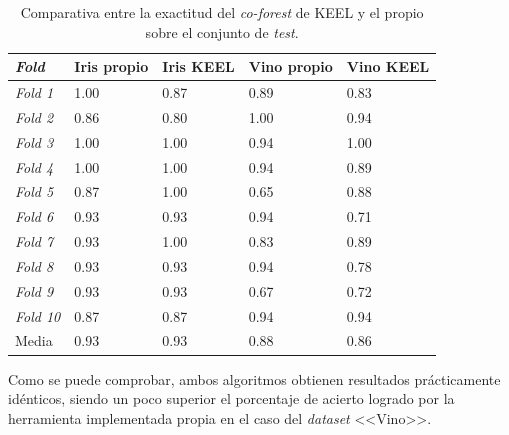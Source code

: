\begin{table}
	\begin{centering}
		
		\begin{tabular}{@{}p{6em} p{6em} p{6em} p{6em} p{6em} @{}}
			
			\toprule
			\textbf{\textit{Fold}} & \textbf{Iris propio} & \textbf{Iris KEEL} & \textbf{Vino propio} & \textbf{Vino KEEL}\\ 
			\midrule
			\textit{Fold 1} &1.00	&0.87	&0.89	&0.83 \\
			\textit{Fold 2} &0.86	&0.80	&1.00	&0.94 \\
			\textit{Fold 3} &1.00	&1.00	&0.94	&1.00 \\
			\textit{Fold 4} &1.00	&1.00	&0.94	&0.89 \\
			\textit{Fold 5} &0.87	&1.00	&0.65	&0.88 \\
			\textit{Fold 6} &0.93	&0.93	&0.94	&0.71 \\
			\textit{Fold 7} &0.93	&1.00	&0.83	&0.89 \\
			\textit{Fold 8} &0.93	&0.93	&0.94	&0.78 \\
			\textit{Fold 9} &0.93	&0.93	&0.67	&0.72 \\
			\textit{Fold 10}&0.87	&0.87	&0.94	&0.94 \\
			Media 			&0.93	&0.93	&0.88	&0.86 \\
		\end{tabular}
	\end{centering}
	\caption{Comparativa entre la exactitud del \textit{co-forest} de KEEL y el propio sobre el conjunto de \textit{test}.}
	\label{tabla_coforest_keelvsnuestro}	
\end{table}

Como se puede comprobar, ambos algoritmos obtienen resultados prácticamente idénticos, siendo un poco superior el porcentaje de acierto logrado por la herramienta implementada propia en el caso del \textit{dataset} <<Vino>>.